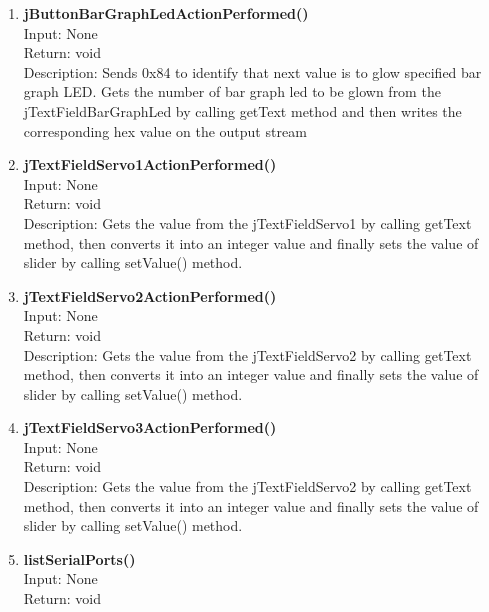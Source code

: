 \documentclass{article}
\begin{document}
\begin{enumerate}
		\item \textbf{jButtonBarGraphLedActionPerformed()} \vspace{0.25cm} \\
		Input: None \\
		Return: void \\
		Description: Sends 0x84 to identify that next value is to glow specified bar graph LED. Gets the number of bar graph led to be glown from the jTextFieldBarGraphLed by calling getText method and then writes the corresponding hex value on the output stream \vspace{0.5cm} \\
		\item \textbf{jTextFieldServo1ActionPerformed()} \vspace{0.25cm} \\
		Input: None \\
		Return: void \\
		Description: Gets the value from the jTextFieldServo1 by calling getText method, then converts it into an integer value and finally sets the value of slider by calling setValue() method. \vspace{0.5cm} \\
		\item \textbf{jTextFieldServo2ActionPerformed()} \\
		Input: None \\
		Return: void \\
		Description:  Gets the value from the jTextFieldServo2 by calling getText method, then converts it into an integer value and finally sets the value of slider by calling setValue() method. \vspace{0.5cm} \\
		\item \textbf{jTextFieldServo3ActionPerformed()} \\
		Input: None \\
		Return: void \\
		Description: Gets the value from the jTextFieldServo2 by calling getText method, then converts it into an integer value and finally sets the value of slider by calling setValue() method. \vspace{0.5cm} \\
		\item \textbf{listSerialPorts()} \vspace{0.25cm} \\
		Input: None \\
		Return: void \\

\end{enumerate}
\end{document}
